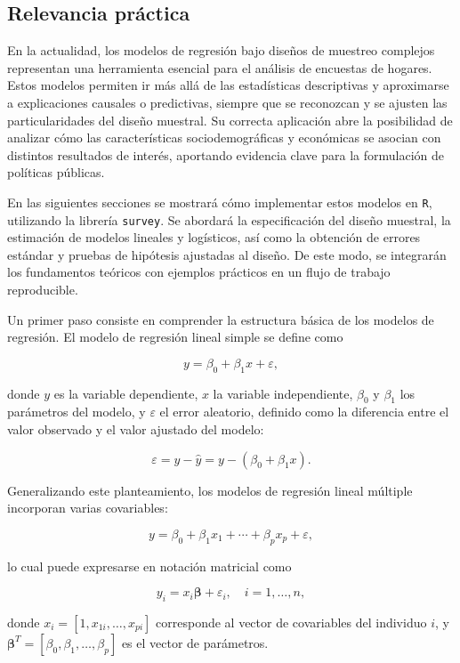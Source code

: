 \documentclass[
  12pt,
]{book}
\begin{document}
\subsection{Relevancia práctica}\label{relevancia-pruxe1ctica}

En la actualidad, los modelos de regresión bajo diseños de muestreo complejos representan una herramienta esencial para el análisis de encuestas de hogares. Estos modelos permiten ir más allá de las estadísticas descriptivas y aproximarse a explicaciones causales o predictivas, siempre que se reconozcan y se ajusten las particularidades del diseño muestral. Su correcta aplicación abre la posibilidad de analizar cómo las características sociodemográficas y económicas se asocian con distintos resultados de interés, aportando evidencia clave para la formulación de políticas públicas.

En las siguientes secciones se mostrará cómo implementar estos modelos en \texttt{R}, utilizando la librería \texttt{survey}. Se abordará la especificación del diseño muestral, la estimación de modelos lineales y logísticos, así como la obtención de errores estándar y pruebas de hipótesis ajustadas al diseño. De este modo, se integrarán los fundamentos teóricos con ejemplos prácticos en un flujo de trabajo reproducible.

Un primer paso consiste en comprender la estructura básica de los modelos de regresión. El modelo de regresión lineal simple se define como

\[
y = \beta_{0} + \beta_{1}x + \varepsilon,
\]

donde \(y\) es la variable dependiente, \(x\) la variable independiente, \(\beta_{0}\) y \(\beta_{1}\) los parámetros del modelo, y \(\varepsilon\) el error aleatorio, definido como la diferencia entre el valor observado y el valor ajustado del modelo:

\[
\varepsilon = y - \hat{y} = y - (\beta_{0} + \beta_{1}x).
\]

Generalizando este planteamiento, los modelos de regresión lineal múltiple incorporan varias covariables:

\[
y = \beta_{0} + \beta_{1}x_{1} + \cdots + \beta_{p}x_{p} + \varepsilon,
\]

lo cual puede expresarse en notación matricial como

\[
y_{i} = x_{i}\boldsymbol{\beta} + \varepsilon_{i}, \quad i=1,\ldots,n,
\]

donde \(x_{i} = [1, x_{1i}, \ldots, x_{pi}]\) corresponde al vector de covariables del individuo \(i\), y \(\boldsymbol{\beta}^{T} = [\beta_{0}, \beta_{1}, \ldots, \beta_{p}]\) es el vector de parámetros.
\end{document}

